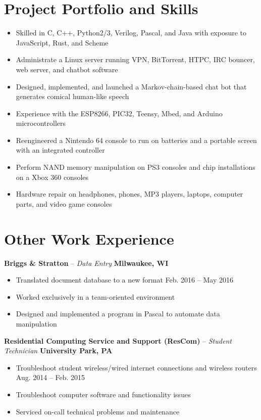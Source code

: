 \documentclass[letterpaper,10pt]{article}
\begin{document}
\section{Project Portfolio and Skills}
\begin{itemize}
\item Skilled in C, C++, Python2/3, Verilog, Pascal, and Java with exposure to JavaScript, Rust, and Scheme
\item Administrate a Linux server running VPN, BitTorrent, HTPC, IRC bouncer, web server, and chatbot software
\item Designed, implemented, and launched a Markov-chain-based chat bot that generates comical human-like speech
\item Experience with the ESP8266, PIC32, Teensy, Mbed, and Arduino microcontrollers
\item Reengineered a Nintendo 64 console to run on batteries and a portable screen with an integrated controller
\item Perform NAND memory manipulation on PS3 consoles and chip installations on a Xbox 360 consoles
\item Hardware repair on headphones, phones, MP3 players, laptops, computer parts, and video game consoles
\end{itemize}

\section{Other Work Experience}
\textbf{Briggs \& Stratton} -- \textit{Data Entry} \hfill \textbf{Milwaukee, WI}
\begin{itemize}
\item Translated document database to a new format \hfill Feb. 2016 -- May 2016
\item Worked exclusively in a team-oriented environment
\item Designed and implemented a program in Pascal to automate data manipulation
\end{itemize}
\textbf{Residential Computing Service and Support (ResCom)} -- \textit{Student Technician} \hfill \textbf{University Park, PA}
\begin{itemize}
\item Troubleshoot student wireless/wired internet connections and wireless routers \hfill Aug. 2014 -- Feb. 2015
\item Troubleshoot computer software and functionality issues
\item Serviced on-call technical problems and maintenance
\end{itemize}
\end{document}
